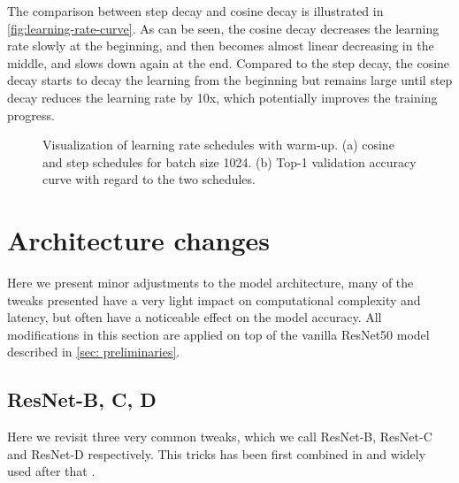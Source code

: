 The comparison between step decay and cosine decay is illustrated in \autoref{fig:learning-rate-curve}. As can be seen, the cosine decay decreases the learning rate slowly at the beginning, and then becomes almost linear decreasing in the middle, and slows down again at the end. Compared to the step decay, the cosine decay starts to decay the learning from the beginning but remains large until step decay reduces the learning rate by 10x, which potentially improves the training progress.

\begin{figure}[t!]
  \centering
  \caption{Visualization of learning rate schedules with warm-up. (a) cosine and step schedules for batch size 1024. (b) Top-1 validation accuracy curve with regard to the two schedules.}
  \label{fig:learning-rate-curve}
\end{figure}







\section{Architecture changes}

Here we present minor adjustments to the model architecture, many of the tweaks presented have a very light impact on computational complexity and latency, but often have a noticeable effect on the model accuracy. All modifications in this section are applied on top of the vanilla ResNet50 model described in \autoref{sec: preliminaries}.

\subsection{ResNet-B, C, D}
Here we revisit three very common tweaks, which we call ResNet-B, ResNet-C and ResNet-D respectively. This tricks has been first combined in \cite{he2019_bag_of_tricks} and widely used after that \cite{ridnik2021_tresnet} \cite{bello2021_revisiting_resnet}. 

